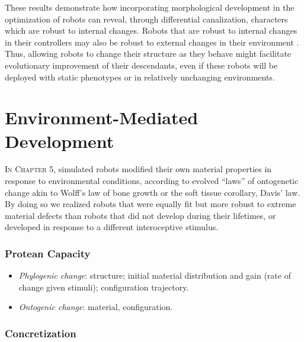 

These results demonstrate how incorporating morphological development in the optimization of robots can reveal, through differential canalization, characters which are robust to internal changes.
Robots that are robust to internal changes in their controllers may also be robust to external changes in their environment \cite{bongard2011morphological}.
Thus, allowing robots to change their structure as they behave might facilitate evolutionary improvement of their descendants, even if these robots will be deployed with static phenotypes or in relatively unchanging environments.



\section{Environment-Mediated Development}

\textsc{In Chapter 5,}
simulated robots modified their own material properties
in response to environmental conditions,
according to evolved ``laws'' of ontogenetic change akin to Wolff's law of bone growth \cite{wolff1893gesetz} or the soft tissue corollary, Davis' law.
By doing so we realized robots that were equally fit but more robust to extreme material defects than robots that did not develop during their lifetimes, or developed in response to a different interoceptive stimulus.


\subsubsection*{Protean Capacity}

\begin{itemize}
    \item \textit{Phylogenic change}: structure; initial material distribution and gain (rate of change given stimuli); configuration trajectory.
    \item \textit{Ontogenic change}: material, configuration.
\end{itemize}


\subsubsection*{Concretization}


